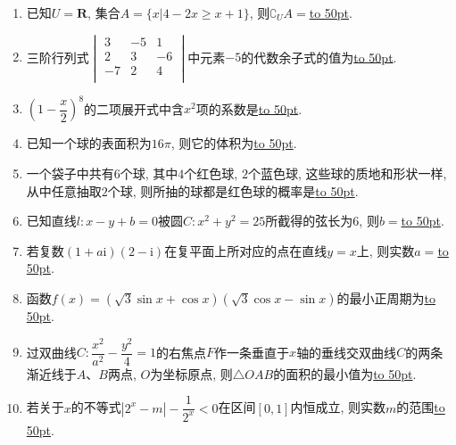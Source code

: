 \documentclass[10pt,a4paper]{article}
\newcommand{\blank}[1]{\underline{\hbox to #1pt{}}}
\begin{document}
\begin{enumerate}[1.]

\item 已知$U=\mathbf{R}$, 集合$A=\{x|4-2x\ge x+1\}$, 则${\complement_U}A=$\blank{50}.
\item 三阶行列式$\begin{vmatrix}   3 & -5 & 1 \\   2 & 3 & -6 \\   -7 & 2 & 4 \\ \end{vmatrix}$中元素$-5$的代数余子式的值为\blank{50}.
\item $(1-\dfrac x2)^8$的二项展开式中含$x^2$项的系数是\blank{50}.
\item 已知一个球的表面积为$16\pi$, 则它的体积为\blank{50}.
\item 一个袋子中共有$6$个球, 其中$4$个红色球, $2$个蓝色球, 这些球的质地和形状一样, 从中任意抽取$2$个球, 则所抽的球都是红色球的概率是\blank{50}.
\item 已知直线$l:x-y+b=0$被圆$C:x^2+y^2=25$所截得的弦长为$6$, 则$b=$\blank{50}.
\item 若复数$(1+a\mathrm{i})(2-\mathrm{i})$在复平面上所对应的点在直线$y=x$上, 则实数$a=$\blank{50}.
\item 函数$f(x)=(\sqrt3\sin x+\cos x)(\sqrt3\cos x-\sin x)$的最小正周期为\blank{50}.
\item 过双曲线$C:\dfrac{x^2}{a^2}-\dfrac{y^2}4=1$的右焦点$F$作一条垂直于$x$轴的垂线交双曲线$C$的两条渐近线于$A$、$B$两点, $O$为坐标原点, 则$\triangle OAB$的面积的最小值为\blank{50}.
\item 若关于$x$的不等式$|2^x-m|-\dfrac1{2^x}<0$在区间$[0,1]$内恒成立, 则实数$m$的范围\blank{50}.



\end{enumerate}
\end{document}
